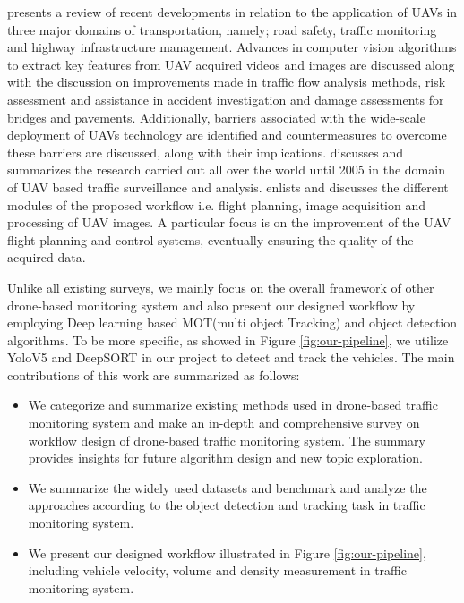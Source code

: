 \documentclass[10pt,twocolumn,letterpaper]{article}  %
\begin{document}
\cite{outay2020applications} presents a review of recent developments in relation to the application of UAVs in three major domains of transportation, namely; road safety, traffic monitoring and highway infrastructure management. Advances in computer vision algorithms to extract key features from UAV acquired videos and images are discussed along with the discussion on improvements made in traffic flow analysis methods, risk assessment and assistance in accident investigation and damage assessments for bridges and pavements. Additionally, barriers associated with the wide-scale deployment of UAVs technology are identified and countermeasures to overcome these barriers are discussed, along with their implications. 
\cite{puri2005survey} discusses and summarizes the research carried out all over the world until 2005 in the domain of UAV based traffic surveillance and analysis. \cite{heintz2007images} enlists and discusses the different modules of the proposed workflow i.e. flight planning, image acquisition and processing of UAV images. A particular focus is on the improvement of the UAV flight planning and control systems, eventually ensuring the quality of the acquired data. 


Unlike all existing surveys, we mainly focus on the overall framework of other drone-based monitoring system and also present our designed workflow by employing Deep learning based MOT(multi object Tracking) and object detection algorithms. To be more specific, as showed in Figure \ref{fig:our-pipeline}, we utilize YoloV5 \cite{github_yolov5} and DeepSORT \cite{wojke2017simple} in our project to detect and track the vehicles. The main contributions of this work are summarized as follows:
\begin{itemize}
	\item We categorize and summarize existing methods used in drone-based traffic monitoring system and make an in-depth and comprehensive survey on workflow design of drone-based traffic monitoring system. The summary provides insights for future algorithm design and new topic exploration.
	
	\item We summarize the widely used datasets and benchmark and analyze the approaches according to the object detection and tracking task in traffic monitoring system.
	
	\item We present our designed workflow illustrated in Figure \ref{fig:our-pipeline}, including vehicle velocity, volume and density measurement in traffic monitoring system.
\end{itemize}
\end{document}
